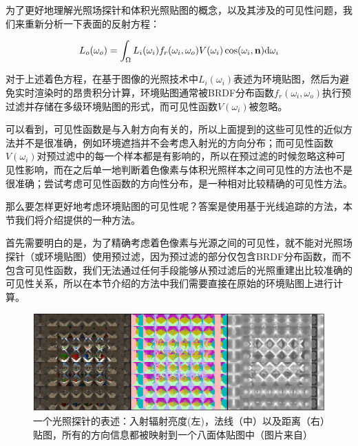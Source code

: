 为了更好地理解光照场探针和体积光照贴图的概念，以及其涉及的可见性问题，我们来重新分析一下表面的反射方程：

\begin{equation}
	L_o(\omega_o)=\int_{\Omega}L_i(\omega_i)f_r(\omega_i,\omega_o)V(\omega_i)\cos(\omega_i,\mathbf{n}){\rm d}\omega_i
\end{equation}

对于上述着色方程，在基于图像的光照技术中$L_i(\omega_i)$表述为环境贴图，然后为避免实时渲染时的昂贵积分计算，环境贴图通常被BRDF分布函数$f_r(\omega_i,\omega_o)$执行预过滤并存储在多级环境贴图的形式，而可见性函数$V(\omega_i)$被忽略。

可以看到，可见性函数是与入射方向有关的，所以上面提到的这些可见性的近似方法并不是很准确，例如环境遮挡并不会考虑入射光的方向分布；而可见性函数$V(\omega_i)$对预过滤中的每一个样本都是有影响的，所以在预过滤的时候忽略这种可见性影响，而在之后单一地判断着色像素与体积光照样本之间可见性的方法也不是很准确；\cite{a:PrecomputedLightinginCallofDuty}尝试考虑可见性函数的方向性分布，是一种相对比较精确的可见性方法。

那么要怎样更好地考虑环境贴图的可见性呢？答案是使用基于光线追踪的方法，本节我们将介绍\cite{a:Real-TimeGlobalIlluminationusingPrecomputedLightFieldProbes}提供的一种方法。

首先需要明白的是，为了精确考虑着色像素与光源之间的可见性，就不能对光照场探针（或环境贴图）使用预过滤，因为预过滤的部分仅包含BRDF分布函数，而不包含可见性函数，我们无法通过任何手段能够从预过滤后的光照重建出比较准确的可见性关系，所以在本节介绍的方法中我们需要直接在原始的环境贴图上进行计算。

\begin{figure}
\begin{fullwidth}
	\includegraphics[width=\thewidth]{figures/pl/light-field-probes}
	\caption{一个光照探针的表述：入射辐射亮度(左)，法线（中）以及距离（右）贴图，所有的方向信息都被映射到一个八面体贴图中（图片来自\cite{a:Real-TimeGlobalIlluminationusingPrecomputedLightFieldProbes}）}
	\label{f:pl-light-field-probes}
\end{fullwidth}
\end{figure}

